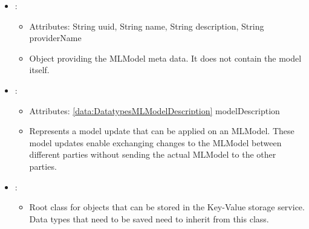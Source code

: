 \begin{itemize}[nolistsep,noitemsep]
\item {}: 
\begin{itemize}[noitemsep,nolistsep]
\item[] Attributes: String uuid, String name, String description, String providerName
\item[] Object providing the MLModel meta data. It does not contain the model itself.
\end{itemize}

\item {}: 
\begin{itemize}[noitemsep,nolistsep]
\item[] Attributes: \ref{data:DatatypesMLModelDescription} modelDescription
\item[] Represents a model update that can be applied on an MLModel.
These model updates enable exchanging changes to the MLModel between different parties without sending the actual MLModel to the other parties.
\end{itemize}

\item {}: 
\begin{itemize}[noitemsep,nolistsep]

\item[] Root class for objects that can be stored in the Key-Value storage service.
Data types that need to be saved need to inherit from this class.
\end{itemize}


\end{itemize}
